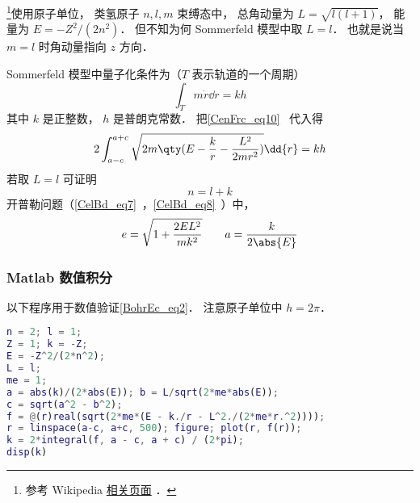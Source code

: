 
\begin{issues}
\issueDraft
\end{issues}

\footnote{参考 Wikipedia \href{https://en.wikipedia.org/wiki/Old_quantum_theory}{相关页面}
．}使用原子单位， 类氢原子 $n,l,m$ 束缚态中， 总角动量为 $L = \sqrt{l(l+1)}$， 能量为 $E = -Z^2/(2n^2)$． 但不知为何 Sommerfeld 模型中取 $L = l$． 也就是说当 $m = l$ 时角动量指向 $z$ 方向．

Sommerfeld 模型中量子化条件为（$T$ 表示轨道的一个周期）
\begin{equation}
\int_T m\dot r \dd{r} = kh
\end{equation}
其中 $k$ 是正整数， $h$ 是普朗克常数． 把\autoref{CenFrc_eq10}~ 代入得
\begin{equation}\label{BohrEc_eq1}
2\int_{a-c}^{a+c} \sqrt{2m\qty(E - \frac{k}{r} - \frac{L^2}{2mr^2})} \dd{r} = kh
\end{equation}
若取 $L = l$ 可证明
\begin{equation}\label{BohrEc_eq2}
n = l + k
\end{equation}
开普勒问题（\autoref{CelBd_eq7}~，\autoref{CelBd_eq8}~）中，
\begin{equation}
e = \sqrt{1 + \frac{2EL^2}{mk^2}}
\qquad
a = \frac{k}{2\abs{E}}
\end{equation}

\subsubsection{Matlab 数值积分}
以下程序用于数值验证\autoref{BohrEc_eq2}． 注意原子单位中 $h = 2\pi$．
\begin{lstlisting}[language=matlab]
n = 2; l = 1;
Z = 1; k = -Z;
E = -Z^2/(2*n^2);
L = l;
me = 1;
a = abs(k)/(2*abs(E)); b = L/sqrt(2*me*abs(E));
c = sqrt(a^2 - b^2);
f = @(r)real(sqrt(2*me*(E - k./r - L^2./(2*me*r.^2))));
r = linspace(a-c, a+c, 500); figure; plot(r, f(r));
k = 2*integral(f, a - c, a + c) / (2*pi);
disp(k)
\end{lstlisting}
